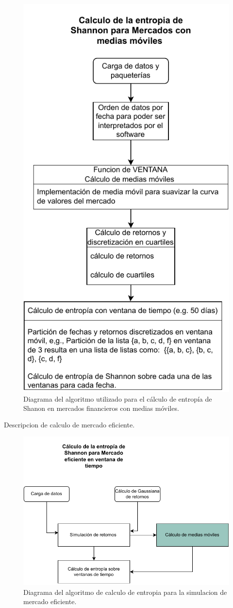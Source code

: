 \begin{figure}
	\centering
	\includegraphics[width=0.7\linewidth]{figures/entropiaMAV}
	\caption{Diagrama del algoritmo utilizado para el c\'alculo de entrop\'ia de Shanon en mercados financieros con medias m\'oviles.}
	\label{entropiamav}
\end{figure}

Descripcion de calculo de mercado eficiente.



\begin{figure}
	\centering
	\includegraphics[width=0.9\linewidth]{figures/simulacion}
	\caption{Diagrama del algoritmo de calculo de entropia para la simulacion de mercado eficiente. }
	\label{simulacion}
\end{figure}

